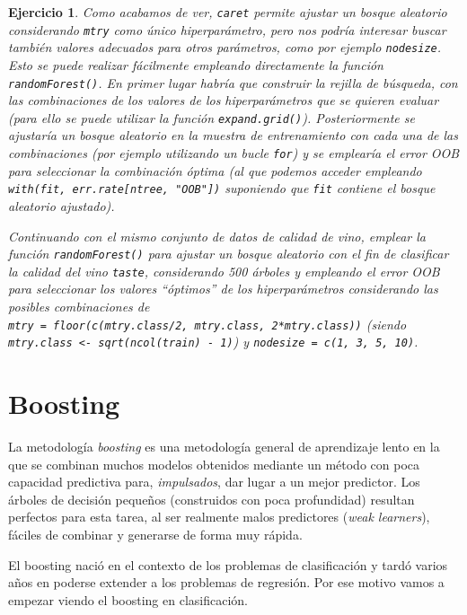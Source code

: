 \documentclass[
]{book}
\theoremstyle{break}
\newtheorem{exercise}{Ejercicio}[chapter]
\theoremstyle{nonumberplain}
\begin{document}
\begin{exercise}
\protect\hypertarget{exr:rf-tunegrid}{}\label{exr:rf-tunegrid}Como acabamos de ver, \texttt{caret} permite ajustar un bosque aleatorio considerando \texttt{mtry} como único hiperparámetro, pero nos podría interesar buscar también valores adecuados para otros parámetros, como por ejemplo \texttt{nodesize}.
Esto se puede realizar fácilmente empleando directamente la función \texttt{randomForest()}.
En primer lugar habría que construir la rejilla de búsqueda, con las combinaciones de los valores de los hiperparámetros que se quieren evaluar (para ello se puede utilizar la función \texttt{expand.grid()}).
Posteriormente se ajustaría un bosque aleatorio en la muestra de entrenamiento con cada una de las combinaciones (por ejemplo utilizando un bucle \texttt{for}) y se emplearía el error OOB para seleccionar la combinación óptima (al que podemos acceder empleando \texttt{with(fit,\ err.rate{[}ntree,\ "OOB"{]})} suponiendo que \texttt{fit} contiene el bosque aleatorio ajustado).

Continuando con el mismo conjunto de datos de calidad de vino, emplear la función \texttt{randomForest()} para ajustar un bosque aleatorio con el fin de clasificar la calidad del vino \texttt{taste}, considerando 500 árboles y empleando el error OOB para seleccionar los valores ``óptimos'' de los hiperparámetros considerando las posibles combinaciones de \texttt{mtry\ =\ floor(c(mtry.class/2,\ mtry.class,\ 2*mtry.class))} (siendo \texttt{mtry.class\ \textless{}-\ sqrt(ncol(train)\ -\ 1)}) y \texttt{nodesize\ =\ c(1,\ 3,\ 5,\ 10)}.
\end{exercise}

\hypertarget{boosting}{%
\section{Boosting}\label{boosting}}

La metodología \emph{boosting} es una metodología general de aprendizaje lento en la que se combinan muchos modelos obtenidos mediante un método con poca capacidad predictiva para, \emph{impulsados}, dar lugar a un mejor predictor. Los árboles de decisión pequeños (construidos con poca profundidad) resultan perfectos para esta tarea, al ser realmente malos predictores (\emph{weak learners}), fáciles de combinar y generarse de forma muy rápida.

El boosting nació en el contexto de los problemas de clasificación y tardó varios años en poderse extender a los problemas de regresión. Por ese motivo vamos a empezar viendo el boosting en clasificación.
\end{document}
